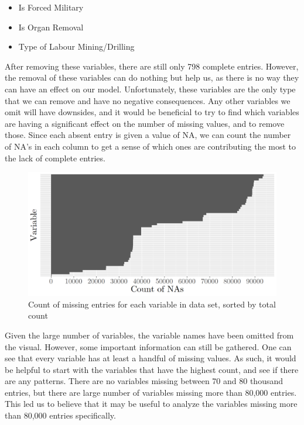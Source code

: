 \documentclass{article} %
\begin{document}
	\begin{multicols}{2}
		\begin{itemize}
			\item Is Forced Military
			\item Is Organ Removal
			\item Type of Labour Mining/Drilling
		\end{itemize}
	\end{multicols}
	
	After removing these variables, there are still only 798 complete entries. However, the removal of these variables can do nothing but help us, as there is no way they can have an effect on our model. Unfortunately, these variables are the only type that we can remove and have no negative consequences. Any other variables we omit will have downsides, and it would be beneficial to try to find which variables are having a significant effect on the number of missing values, and to remove those. Since each absent entry is given a value of NA, we can count the number of NA's in each column to get a sense of which ones are contributing the most to the lack of complete entries.
	
	\begin{figure}[H]
		\includegraphics[width = \textwidth]{NABarplot}
		\caption{Count of missing entries for each variable in data set, sorted by total count}
		\label{fig:NABarplot}
	\end{figure}
	
	Given the large number of variables, the variable names have been omitted from the visual. However, some important information can still be gathered. One can see that every variable has at least a handful of missing values. As such, it would be helpful to start with the variables that have the highest count, and see if there are any patterns. There are no variables missing between 70 and 80 thousand entries, but there are large number of variables missing more than 80,000 entries. This led us to believe that it may be useful to analyze the variables missing more than 80,000 entries specifically.
	
\end{document}
